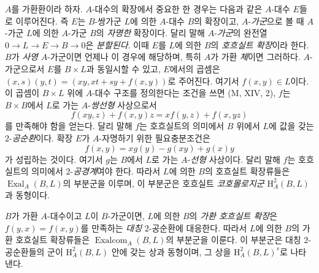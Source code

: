 \begin{env}[18.4.3]
\label{0.18.4.3-fr}
$A$를 가환환이라 하자. $A$-대수의 확장에서 중요한 한 경우는
다음과 같은 $A$-대수 $E$들로 이루어진다. 즉 $E$는
$B$-쌍가군 $L$에 의한 $A$-대수 $B$의 확장이고, $A$-\emph{가군}으로
볼 때 $A$-가군 $L$에 의한 $A$-가군 $B$의 \emph{자명한} 확장이다.
달리 말해 $A$-\emph{가군}의 완전열
$0\to L\to E\to B\to0$은 \emph{분할된다}. 이때 $E$를
$L$에 의한 $B$의 \emph{호흐실트 확장}이라 한다. $B$가
\emph{사영} $A$-가군이면 언제나 이 경우에 해당하며, 특히 $A$가
가환 \emph{체}이면 그러하다. $A$-가군으로서 $E$를 $B\times L$과
동일시할 수 있고, $E$에서의 곱셈은
$(x,s)(y,t)=(xy,xt+sy+f(x,y))$로 주어진다. 여기서 $f(x,y)\in L$이다.
이 곱셈이 $B\times L$ 위에 $A$-대수 구조를 정의한다는 조건을 쓰면
(M, XIV, 2), $f$는 $B\times B$에서 $L$로 가는
$A$-\emph{쌍선형} 사상으로서
\begin{equation}
\label{0.18.4.3.1-fr}
\tag{18.4.3.1}
  f(xy,z)+f(x,y)z=xf(y,z)+f(x,yz)
\end{equation}
를 만족해야 함을 얻는다. 달리 말해 $f$는 호흐실트의 의미에서
$B$ 위에서 $L$에 값을 갖는 $2$-\emph{공순환}이다.
확장 $E$가 $A$-자명하기 위한 필요충분조건은
\begin{equation}
\label{0.18.4.3.2-fr}
\tag{18.4.3.2}
  f(x,y)=xg(y)-g(xy)+g(x)y
\end{equation}
가 성립하는 것이다. 여기서 $g$는 $B$에서 $L$로 가는
$A$-\emph{선형} 사상이다. 달리 말해 $f$는 호흐실트의 의미에서
$2$-\emph{공경계}여야 한다. 따라서 $L$에 의한 $B$의 호흐실트
확장류들은 $\operatorname{Exal}_A(B,L)$의 부분군을 이루며,
이 부분군은 호흐실트 \emph{코호몰로지군}
$\mathrm H_A^2(B,L)$과 동형이다.

$B$가 가환 $A$-대수이고 $L$이 $B$-가군이면, $L$에 의한 $B$의
\emph{가환 호흐실트 확장}은 $f(y,x)=f(x,y)$를 만족하는
\emph{대칭} $2$-공순환에 대응한다. 따라서 $L$에 의한 $B$의 가환
호흐실트 확장류들은 $\operatorname{Exalcom}_A(B,L)$의 부분군을
이룬다. 이 부분군은 대칭 $2$-공순환들의 군이
$\mathrm H_A^2(B,L)$ 안에 갖는 상과 동형이며, 그 상을
$\mathrm H_A^2(B,L)^s$로 나타낸다.
\end{env}

